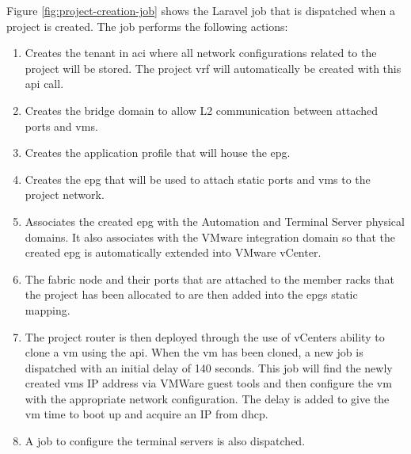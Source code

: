 Figure \ref{fig:project-creation-job} shows the Laravel job that is dispatched when a project is created. The job performs the following actions:
\begin{enumerate}
    \item Creates the tenant in \gls{aci} where all network configurations related to the project will be stored. The project \gls{vrf} will automatically be created with this \gls{api} call.
    \item Creates the bridge domain to allow L2 communication between attached ports and \gls{vm}s.
    \item Creates the application profile that will house the \gls{epg}.
    \item Creates the \gls{epg} that will be used to attach static ports and \gls{vm}s to the project network.
    \item Associates the created \gls{epg} with the Automation and Terminal Server physical domains. It also associates with the VMware integration domain so that the created \gls{epg} is automatically extended into VMware vCenter.
    \item The fabric node and their ports that are attached to the member racks that the project has been allocated to are then added into the \gls{epg}s static mapping.
    \item The project router is then deployed through the use of vCenters ability to clone a \gls{vm} using the \gls{api}. When the \gls{vm} has been cloned, a new job is dispatched with an initial delay of 140 seconds. This job will find the newly created \gls{vm}s IP address via VMWare guest tools and then configure the \gls{vm} with the appropriate network configuration. The delay is added to give the \gls{vm} time to boot up and acquire an IP from \gls{dhcp}. 
    \item A job to configure the terminal servers is also dispatched.
\end{enumerate}
